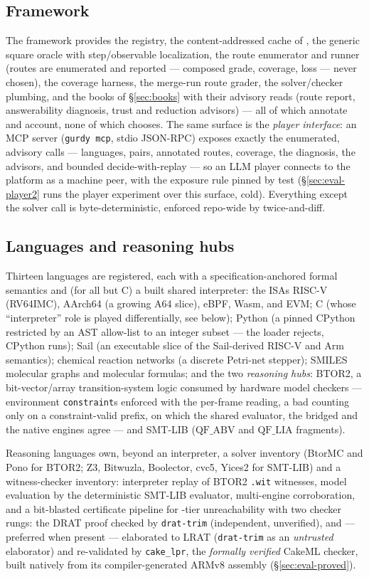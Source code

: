 \subsection{Framework}
The framework provides the registry, the content-addressed cache of
, the generic square oracle with step/observable
localization, the route enumerator and runner (routes are enumerated
and reported — composed grade, coverage, loss — never chosen), the
coverage harness, the merge-run route grader, the solver/checker
plumbing, and the books of \S\ref{sec:books} with their advisory
reads (route report, answerability diagnosis, trust and reduction
advisors) — all of which annotate and account, none of which chooses.
The same surface is the \emph{player interface}: an MCP server
(\texttt{gurdy mcp}, stdio JSON-RPC) exposes exactly the enumerated,
advisory calls — languages, pairs, annotated routes, coverage, the
diagnosis, the advisors, and bounded decide-with-replay — so an LLM
player connects to the platform as a machine peer, with the exposure
rule pinned by test (\S\ref{sec:eval-player2} runs the player
experiment over this surface, cold).
Everything except the solver call is byte-deterministic, enforced
repo-wide by twice-and-diff.

\subsection{Languages and reasoning hubs}
Thirteen languages are registered, each with a specification-anchored
formal semantics and (for all but C) a built shared
interpreter: the ISAs RISC-V (RV64IMC), AArch64 (a growing A64 slice),
eBPF, Wasm, and EVM; C (whose ``interpreter'' role is played
differentially, see below); Python (a pinned CPython restricted by an AST
allow-list to an integer subset --- the loader rejects, CPython runs);
Sail (an executable slice of the Sail-derived RISC-V and Arm semantics);
chemical reaction networks (a discrete Petri-net stepper); SMILES
molecular graphs and molecular formulas; and the two \emph{reasoning
hubs}: BTOR2, a bit-vector/array transition-system logic consumed by
hardware model checkers --- environment \texttt{constraint}s enforced
with the per-frame reading, a bad counting only on a constraint-valid
prefix, on which the shared evaluator, the bridged and the native
engines agree --- and SMT-LIB ($\mathrm{QF\_ABV}$ and
$\mathrm{QF\_LIA}$ fragments).

Reasoning languages own, beyond an interpreter, a solver inventory
(BtorMC and Pono for BTOR2; Z3, Bitwuzla, Boolector, cvc5, Yices2 for
SMT-LIB) and a witness-checker inventory: interpreter replay of BTOR2
\texttt{.wit} witnesses, model evaluation by the deterministic SMT-LIB
evaluator, multi-engine corroboration, and a bit-blasted certificate
pipeline for \tprov-tier unreachability with two checker rungs: the
DRAT proof checked by \texttt{drat-trim} (independent, unverified),
and --- preferred when present --- elaborated to LRAT
(\texttt{drat-trim} as an \emph{untrusted} elaborator) and re-validated
by \texttt{cake\_lpr}, the \emph{formally verified} CakeML checker,
built natively from its compiler-generated ARMv8 assembly
(\S\ref{sec:eval-proved}).

